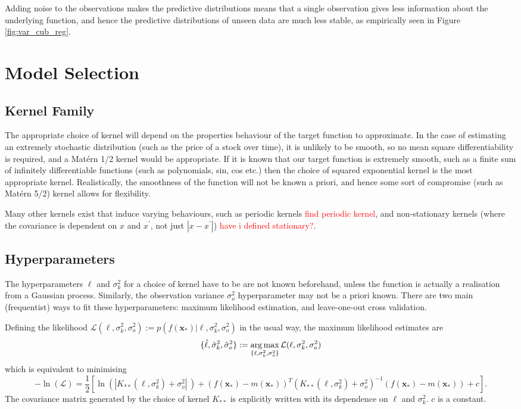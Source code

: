 Adding noise to the observations makes the predictive distributions means
that a single observation gives less information about the underlying function,
and hence the predictive distributions of unseen data are
much less stable, as empirically seen in Figure \ref{fig:var_cub_reg}.

\section{Model Selection}

\subsection*{Kernel Family}

The appropriate choice of kernel will depend on the properties behaviour of the
target function to approximate. In the case of estimating an extremely
stochastic distribution (such as the price of a stock over time), it is
unlikely to be smooth, so no mean square differentiability is required, and a
Mat\'ern 1/2 kernel would be appropriate. If it is known that our target
function is extremely smooth, such as a finite sum of infinitely differentiable
functions (such as polynomials, sin, cos etc.) then the choice of squared
exponential kernel is the most appropriate kernel. Realistically, the
smoothness of the function will not be known a priori, and hence some sort of
compromise (such as Mat\'ern 5/2) kernel allows for flexibility.

Many other kernels exist that induce varying behaviours, such as periodic
kernels \textcolor{red}{find periodic kernel}, and non-stationary kernels
(where the covariance is dependent on $x$ and $x^\prime$, not just
$|x - x^\prime|$)
\textcolor{red}{have i defined stationary?}.

\subsection*{Hyperparameters}

The hyperparameters $\ell$ and $\sigma^2_k$ for a choice of kernel have to be
are not known beforehand, unless the function is actually a realisation from
a Gaussian process. Similarly, the observation variance $\sigma^2_o$
hyperparameter may not be a priori
known. There are two main (frequentist) ways to fit these hyperparameters:
maximum likelihood estimation, and leave-one-out cross validation.

Defining the likelihood
$
    \mathcal{L}(\ell, \sigma^2_k, \sigma^2_o)
    := p(f(\mathbf{x}_*) | \ell, \sigma^2_k, \sigma^2_o)
$ in the usual way,
the maximum likelihood estimates are
$$
    \{\hat{\ell}, \hat{\sigma}^2_k, \hat{\sigma}^2_o\} :=
    \operatorname*{arg\,max}_{\{\ell, \sigma^2_k, \sigma^2_o\}}
    \mathcal{L}(\ell, \sigma^2_k, \sigma^2_o)
$$
which is equivalent to minimising
$$
    -\ln(\mathcal{L}) =\frac{1}{2} \left[
    \ln (|K_{**}(\ell, \sigma^2_k) + \sigma^2_o|\,)
    + (f(\mathbf{x}_*) - m(\mathbf{x}_*))^T
    (K_{**}(\ell, \sigma^2_k) + \sigma^2_o)^{-1}
    (f(\mathbf{x}_*) - m(\mathbf{x}_*)) + c
    \right].
$$
The covariance matrix generated by the choice of kernel $K_{**}$ is
explicitly written with its dependence on $\ell$ and $\sigma^2_k.$ $c$ is a
constant.

